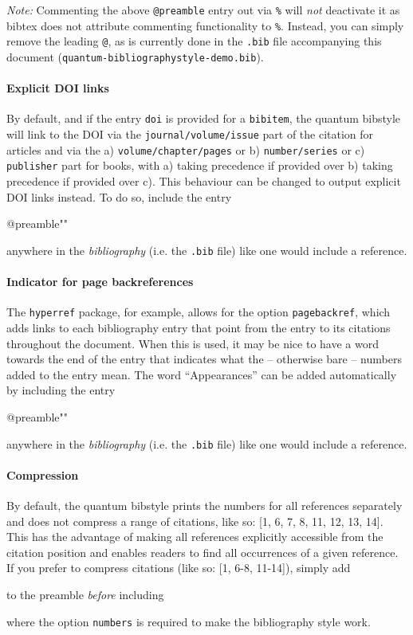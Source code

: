 \documentclass[a4paper,twocolumn,11pt]{quantumarticle}
\begin{document}
\emph{Note:} Commenting the above \texttt{@preamble} entry out via \texttt{\%} will \emph{not} deactivate it as bibtex does not attribute commenting functionality to \texttt{\%}. Instead, you can simply remove the leading \texttt{@}, as is currently done in the \texttt{.bib} file accompanying this document (\texttt{quantum-bibliographystyle-demo.bib}).

\paragraph{Explicit DOI links}
By default, and if the entry \texttt{doi} is provided for a \texttt{bibitem}, the quantum bibstyle will link to the DOI via the \texttt{journal/volume/issue} part of the citation for articles and via the a) \texttt{volume/chapter/pages} or b) \texttt{number/series} or c) \texttt{publisher} part for books, with a) taking precedence if provided over b) taking precedence if provided over c).
This behaviour can be changed to output explicit DOI links instead. To do so, include the entry
\begin{verbatim*}
@preamble{"\MakeDoiLinksExplicit"}
\end{verbatim*}
anywhere in the \emph{bibliography} (i.e. the \texttt{.bib} file) like one would include a reference.

\paragraph{Indicator for page backreferences}
The \texttt{hyperref} package, for example, allows for the option \texttt{pagebackref}, which adds links to each bibliography entry that point from the entry to its citations throughout the document.
When this is used, it may be nice to have a word towards the end of the entry that indicates what the -- otherwise bare -- numbers added to the entry mean.
The word ``Appearances'' can be added automatically by including the entry
\begin{verbatim*}
@preamble{"\PageBackRef"}
\end{verbatim*}
anywhere in the \emph{bibliography} (i.e. the \texttt{.bib} file) like one would include a reference.

\paragraph{Compression}
By default, the quantum bibstyle prints the numbers for all references separately and does not compress
a range of citations, like so: [1, 6, 7, 8, 11, 12, 13, 14].
This has the advantage of making all references explicitly accessible from the citation position and enables readers to find all occurrences of a given reference.
If you prefer to compress citations (like so: [1, 6-8, 11-14]), simply add
\begin{verbatim*}
\end{verbatim*}
to the preamble \emph{before} including
\begin{verbatim*}
\usepackage[numbers]{natbib}
\end{verbatim*}
where the option \texttt{numbers} is required to make the bibliography style work.
\end{document}
